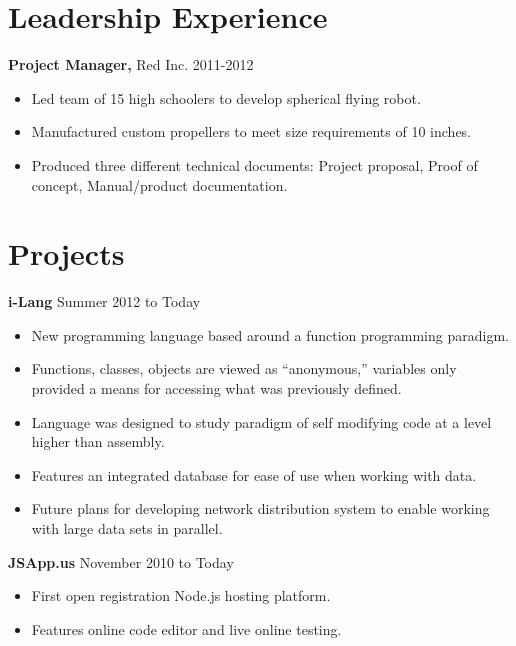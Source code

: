 \documentclass[margin]{res}
\begin{document}
\begin{resume}
\section{Leadership Experience}
{\bf Project Manager,} Red Inc. \hfill 2011-2012
\begin{itemize} \itemsep -2pt
  \item Led team of 15 high schoolers to develop spherical flying robot.
  \item Manufactured custom propellers to meet size requirements of 10 inches.
  \item Produced three different technical documents: Project proposal, Proof of concept, Manual/product documentation.
\end{itemize}


\section{Projects}
{\bf i-Lang} \hfill Summer 2012 to Today
\begin{itemize} \itemsep -2pt
  \item New programming language based around a function programming paradigm.
  \item Functions, classes, objects are viewed as ``anonymous,'' variables only provided a means for accessing what was previously defined.
  \item Language was designed to study paradigm of self modifying code at a level higher than assembly.
  \item Features an integrated database for ease of use when working with data.
  \item Future plans for developing network distribution system to enable working with large data sets in parallel.
\end{itemize}

{\bf JSApp.us} \hfill November 2010 to Today
\begin{itemize} \itemsep -2pt
  \item First open registration Node.js hosting platform.
  \item Features online code editor and live online testing.
\end{itemize}



\end{resume}
\end{document}
